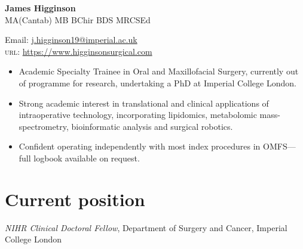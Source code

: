 \documentclass[11pt]{article} %
\begin{document}

{\LARGE\bfseries James Higginson} %
\\{\Large MA(Cantab) MB BChir BDS MRCSEd}
\bigskip\bigskip\medskip %




Email: \href{mailto:j.higginson19@imperial.ac.uk}{j.higginson19@imperial.ac.uk}\\ %
\textsc{url}: \href{https://www.higginsonsurgical.com}{https://www.higginsonsurgical.com}\\ %

\vspace{0.06\textheight} %

\begin{itemize}
\item Academic Specialty Trainee in Oral and Maxillofacial Surgery, currently out of programme for research, undertaking a PhD at Imperial College London. 
\item Strong academic interest in translational and clinical applications of intraoperative technology, incorporating lipidomics, metabolomic mass-spectrometry, bioinformatic analysis and surgical robotics. 
\item Confident operating independently with most index procedures in OMFS---full logbook available on request.
\end{itemize}

\section*{Current position}

\emph{NIHR Clinical Doctoral Fellow}, Department of Surgery and Cancer, Imperial College London%

\end{document}
